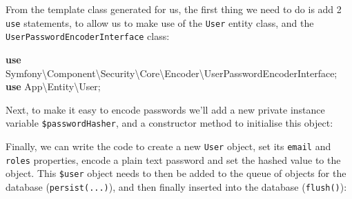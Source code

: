 \documentclass[a4paperpaper,openright]{book}
\newenvironment{Shaded}{}{}
\newcommand{\FunctionTok}[1]{\textcolor[rgb]{0.02,0.16,0.49}{#1}}
\newcommand{\KeywordTok}[1]{\textcolor[rgb]{0.00,0.44,0.13}{\textbf{#1}}}
\newcommand{\NormalTok}[1]{#1}
\newcommand{\OtherTok}[1]{\textcolor[rgb]{0.00,0.44,0.13}{#1}}
\begin{document}
From the template class generated for us, the first thing we need to do
is add 2 \texttt{use} statements, to allow us to make use of the
\texttt{User} entity class, and the
\texttt{UserPasswordEncoderInterface} class:

\begin{Shaded}
\begin{Highlighting}[]
    \KeywordTok{use}\NormalTok{ Symfony\textbackslash{}Component\textbackslash{}Security\textbackslash{}Core\textbackslash{}Encoder\textbackslash{}UserPasswordEncoderInterface}\OtherTok{;}
    \KeywordTok{use}\NormalTok{ App\textbackslash{}Entity\textbackslash{}User}\OtherTok{;}        
\end{Highlighting}
\end{Shaded}

Next, to make it easy to encode passwords we'll add a new private
instance variable \texttt{\$passwordHasher}, and a constructor method to
initialise this object:

\begin{Shaded}
\end{Shaded}

Finally, we can write the code to create a new \texttt{User} object, set
its \texttt{email} and \texttt{roles} properties, encode a plain text
password and set the hashed value to the object. This \texttt{\$user}
object needs to then be added to the queue of objects for the database
(\texttt{persist(...)}), and then finally inserted into the database
(\texttt{flush()}):
\end{document}
